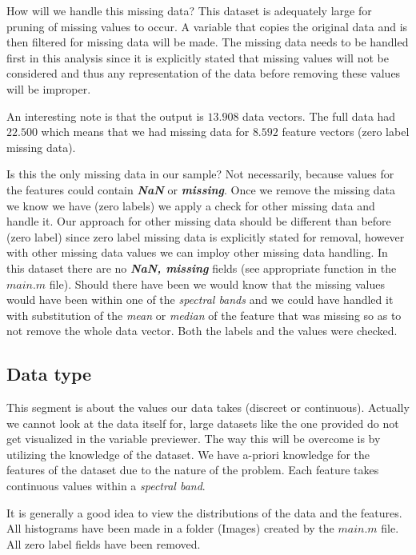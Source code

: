\documentclass[12pt, a4paper]{article}
\begin{document}
How will we handle this missing data? This dataset is adequately large for pruning of missing values to occur. A variable that copies the original data and is then filtered for missing data will be made. The missing data needs to be handled first in this analysis since it is explicitly stated that missing values will not be considered and thus any representation of the data before removing these values will be improper.
\newline

An interesting note is that the output is $13.908$ data vectors. The full data had $22.500$ which means that we had missing data for $8.592$ feature vectors (zero label missing data).
\newline

Is this the only missing data in our sample? Not necessarily, because values for the features could contain \textbf{\textit{NaN}} or \textbf{\textit{missing}}. Once we remove the missing data we know we have (zero labels) we apply a check for other missing data and handle it. Our approach for other missing data should be different than before (zero label) since zero label missing data is explicitly stated for removal, however with other missing data values we can imploy other missing data handling. In this dataset there are no \textbf{\textit{NaN, missing}} fields (see appropriate function in the $main.m$ file). Should there have been we would know that the missing values would have been within one of the \textit{spectral bands} and we could have handled it with substitution of the \textit{mean} or \textit{median} of the feature that was missing so as to not remove the whole data vector. Both the labels and the values were checked.

\subsection{Data type}

This segment is about the values our data takes (discreet or continuous). Actually we cannot look at the data itself for, large datasets like the one provided do not get visualized in the variable previewer. The way this will be overcome is by utilizing the knowledge of the dataset. We have a-priori knowledge for the features of the dataset due to the nature of the problem. Each feature takes continuous values within a \textit{spectral band}.
\newline

It is generally a good idea to view the distributions of the data and the features. All histograms have been made in a folder (Images) created by the $main.m$ file. All zero label fields have been removed.
\newline
\end{document}
